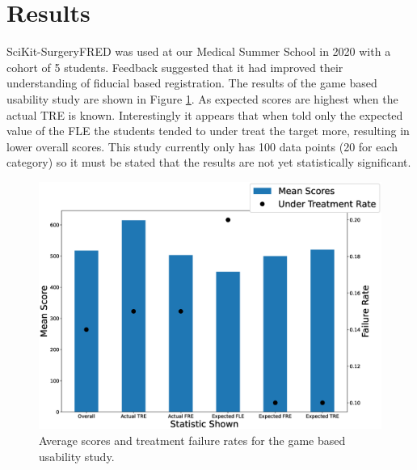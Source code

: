 \section{Results}
SciKit-SurgeryFRED was used at our Medical Summer School in 2020 with a cohort of 5 students. Feedback suggested that it had improved their understanding
of fiducial based registration. The results of the game based usability study are shown in Figure \ref{fig:usability}. As expected scores are 
highest when the actual \gls{TRE} is known. Interestingly it appears that when told only the expected value of the \gls{FLE} the students
tended to under treat the target more, resulting in lower overall scores. This study currently only has 100 data points (20 for each category)
so it must be stated that the results are not yet statistically significant. 

\begin{figure}
        \begin{center}
        \includegraphics[width=0.7\linewidth]{usability.eps}
                \caption{\label{fig:usability}Average scores and treatment failure rates for the game based usability study.}
	\end{center}
\end{figure}


